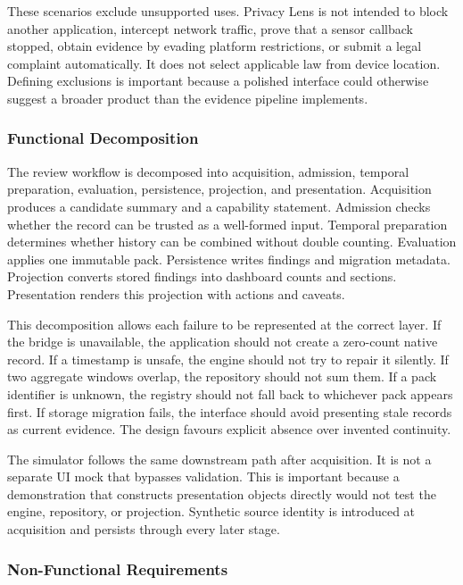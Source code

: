 These scenarios exclude unsupported uses. Privacy Lens is not intended to block another application, intercept network traffic, prove that a sensor callback stopped, obtain evidence by evading platform restrictions, or submit a legal complaint automatically. It does not select applicable law from device location. Defining exclusions is important because a polished interface could otherwise suggest a broader product than the evidence pipeline implements.

\subsubsection{Functional Decomposition}

The review workflow is decomposed into acquisition, admission, temporal preparation, evaluation, persistence, projection, and presentation. Acquisition produces a candidate summary and a capability statement. Admission checks whether the record can be trusted as a well-formed input. Temporal preparation determines whether history can be combined without double counting. Evaluation applies one immutable pack. Persistence writes findings and migration metadata. Projection converts stored findings into dashboard counts and sections. Presentation renders this projection with actions and caveats.

This decomposition allows each failure to be represented at the correct layer. If the bridge is unavailable, the application should not create a zero-count native record. If a timestamp is unsafe, the engine should not try to repair it silently. If two aggregate windows overlap, the repository should not sum them. If a pack identifier is unknown, the registry should not fall back to whichever pack appears first. If storage migration fails, the interface should avoid presenting stale records as current evidence. The design favours explicit absence over invented continuity.

The simulator follows the same downstream path after acquisition. It is not a separate UI mock that bypasses validation. This is important because a demonstration that constructs presentation objects directly would not test the engine, repository, or projection. Synthetic source identity is introduced at acquisition and persists through every later stage.

\subsubsection{Non-Functional Requirements}

